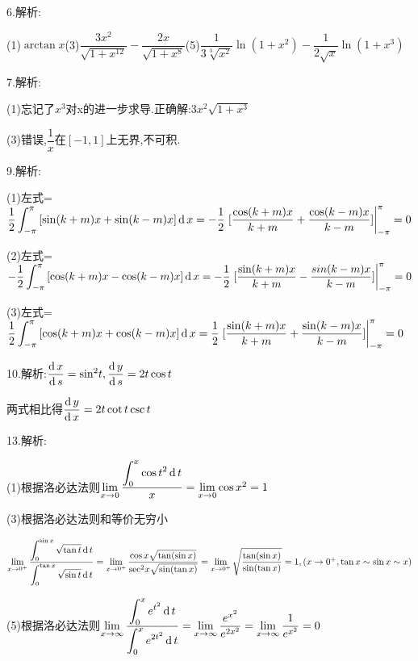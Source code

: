 6.解析:

(1)$\arctan x$(3)$\dfrac{{3{x^2}}}{{\sqrt {1 + {x^{12}}} }} - \dfrac{{2x}}{{\sqrt {1 + {x^8}} }}$(5)$\dfrac{1}{{3\sqrt[3]{{{x^2}}}}}\ln (1 + {x^2}) - \dfrac{1}{{2\sqrt x }}\ln (1 + {x^3})$

7.解析:

(1)忘记了$x^3$对x的进一步求导.正确解:$3{x^2}\sqrt {1 + {x^3}} $

(3)错误,$\dfrac{1}{x}$在$[-1,1]$上无界,不可积.

9.解析:

(1)左式=$\dfrac{1}{2}\displaystyle\int_{ - \pi }^\pi  {[\sin (k + m)x + \sin (k - m)x]\operatorname{\mathop{}\!\mathrm{d}}x =  - \dfrac{1}{2}\left. {[\dfrac{{\cos (k + m)x}}{{k + m}} + \dfrac{{\cos (k - m)x}}{{k - m}}]} \right|} _{ - \pi }^\pi  = 0$

(2)左式=$ - \dfrac{1}{2}\displaystyle\int_{ - \pi }^\pi  {[\cos (k + m)x - \cos (k - m)x]\operatorname{\mathop{}\!\mathrm{d}}x =  - \dfrac{1}{2}\left. {[\dfrac{{\sin (k + m)x}}{{k + m}} - \dfrac{{sin(k - m)x}}{{k - m}}]} \right|} _{ - \pi }^\pi  = 0$

(3)左式=$\dfrac{1}{2}\displaystyle\int_{ - \pi }^\pi  {[\cos (k + m)x + \cos (k - m)x]\operatorname{\mathop{}\!\mathrm{d}}x = \dfrac{1}{2}\left. {[\frac{{\sin (k + m)x}}{{k + m}} + \dfrac{{\sin (k - m)x}}{{k - m}}]} \right|} _{ - \pi }^\pi  = 0$

10.解析:$\dfrac{{\operatorname{\mathop{}\!\mathrm{d}} x}}{{\operatorname{\mathop{}\!\mathrm{d}} s}} = {\sin ^2}t,\dfrac{{\operatorname{\mathop{}\!\mathrm{d}} y}}{{\operatorname{\mathop{}\!\mathrm{d}} s}} = 2t\cos t$

两式相比得$\dfrac{{\operatorname{\mathop{}\!\mathrm{d}} y}}{{\operatorname{\mathop{}\!\mathrm{d}} x}} = 2t\cot t\csc t$

13.解析:

(1)根据洛必达法则$\mathop {\lim }\limits_{x \to 0} \dfrac{{\displaystyle\int_0^x {\cos {t^2}\operatorname{\mathop{}\!\mathrm{d}} t} }}{x} = \mathop {\lim }\limits_{x \to 0} \cos {x^2} = 1$

(3)根据洛必达法则和等价无穷小

$\mathop {\lim }\limits_{x \to {0^+ }} \dfrac{{\displaystyle\int_0^{\sin x} {\sqrt {\tan t} \operatorname{\mathop{}\!\mathrm{d}} t} }}{{\displaystyle\int_0^{\tan x} {\sqrt {\sin t} \operatorname{\mathop{}\!\mathrm{d}} t} }} = \mathop {\lim }\limits_{x \to {0^+ }} \dfrac{{\cos x\sqrt {\tan (\sin x )}}}{{{{\sec }^2}x\sqrt {\sin (\tan x)} }} = \mathop {\lim }\limits_{x \to {0^+ }} \sqrt {\dfrac{{\tan (\sin x)}}{{\sin (\tan x)}}}  = 1,\left( {x \to {0^+ },\tan x \sim \sin x \sim x} \right)$

(5)根据洛必达法则$\mathop {\lim }\limits_{x \to \infty } \dfrac{{\displaystyle\int_0^x {{e^{{t^2}}}\operatorname{\mathop{}\!\mathrm{d}} t} }}{{\displaystyle\int_0^x {{e^{2{t^2}}}\operatorname{\mathop{}\!\mathrm{d}} t} }} = \mathop {\lim }\limits_{x \to \infty } \dfrac{{{e^{{x^2}}}}}{{{e^{2{x^2}}}}} = \mathop {\lim }\limits_{x \to \infty } \dfrac{1}{{{e^{{x^2}}}}} = 0$

